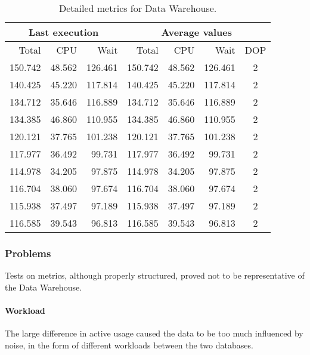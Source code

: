 \begin{table}[p]
    \centering
    \begin{tabular}{|r r r|r r r|c|}
\toprule
\multicolumn{3}{|c|}{Last execution} & \multicolumn{4}{c|}{Average values} \\
\midrule
Total       & CPU     & Wait         & Total    & CPU     & Wait     & DOP  \\
\midrule
150.742     & 48.562 & 126.461       & 150.742  & 48.562  & 126.461  & 2    \\
140.425     & 45.220 & 117.814       & 140.425  & 45.220  & 117.814  & 2    \\
134.712     & 35.646 & 116.889       & 134.712  & 35.646  & 116.889  & 2    \\
134.385     & 46.860 & 110.955       & 134.385  & 46.860  & 110.955  & 2    \\
120.121     & 37.765 & 101.238       & 120.121  & 37.765  & 101.238  & 2    \\
117.977     & 36.492 &  99.731       & 117.977  & 36.492  &  99.731  & 2    \\
114.978     & 34.205 &  97.875       & 114.978  & 34.205  &  97.875  & 2    \\
116.704     & 38.060 &  97.674       & 116.704  & 38.060  &  97.674  & 2    \\
115.938     & 37.497 &  97.189       & 115.938  & 37.497  &  97.189  & 2    \\
116.585     & 39.543 &  96.813       & 116.585  & 39.543  &  96.813  & 2    \\
 \bottomrule
    \end{tabular}
    \caption{Detailed metrics for Data Warehouse.}
    \label{tab:tests:perf:metrics:detailed:dwh}
\end{table}
    
\subsubsection{Problems}
    Tests on metrics, although properly structured, proved not to be representative of the Data Warehouse.
    
    \paragraph{Workload}
        The large difference in active usage caused the data to be too much influenced by noise, in the form of different workloads between the two databases.
        
